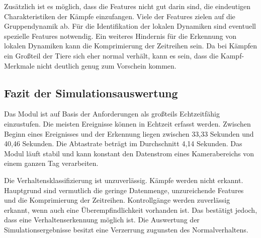 Zusätzlich ist es möglich, dass die Features nicht gut darin sind, die eindeutigen Charakteristiken der Kämpfe einzufangen. Viele der Features zielen auf die Gruppendynamik ab. Für die Identifikation der lokalen Dynamiken sind eventuell spezielle Features notwendig. Ein weiteres Hindernis für die Erkennung von lokalen Dynamiken kann die Komprimierung der Zeitreihen sein. Da bei Kämpfen ein Großteil der Tiere sich eher normal verhält, kann es sein, dass die Kampf-Merkmale nicht deutlich genug zum Vorschein kommen. \par


\subsection{Fazit der Simulationsauswertung}
Das Modul ist auf Basis der Anforderungen als großteils Echtzeitfähig einzustufen. Die meisten Ereignisse können in Echtzeit erfasst werden. Zwischen Beginn eines Ereignisses und der Erkennung liegen zwischen 33,33 Sekunden und 40,46 Sekunden. Die Abtastrate beträgt im Durchschnitt 4,14 Sekunden. Das Modul läuft stabil und kann konstant den Datenstrom eines Kamerabereichs von einem ganzen Tag verarbeiten. \par

Die Verhaltensklassifizierung ist unzuverlässig. Kämpfe werden nicht erkannt. Hauptgrund sind vermutlich die geringe Datenmenge, unzureichende Features und die Komprimierung der Zeitreihen. Kontrollgänge werden zuverlässig erkannt, wenn auch eine Überempfindlichkeit vorhanden ist. Das bestätigt jedoch, dass eine Verhaltenserkennung möglich ist. Die Auswertung der Simulationsergebnisse besitzt eine Verzerrung zugunsten des Normalverhaltens. 